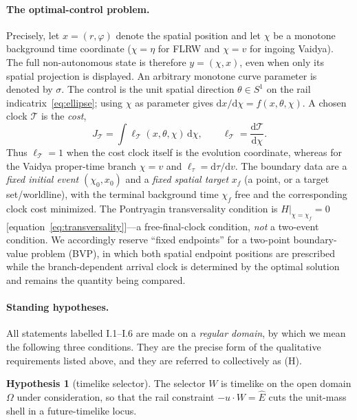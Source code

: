 \documentclass[12pt]{iopart}
\newcommand{\Ehat}{\hat E}
\newcommand{\dd}{\mathrm{d}}
\theoremstyle{plain}
\theoremstyle{definition}
\newtheorem{hypothesis}{Hypothesis}
\theoremstyle{plain}
\theoremstyle{remark}
\begin{document}
\paragraph{The optimal-control problem.} Precisely, let $x=(r,\varphi)$ denote the
spatial position and let $\chi$ be a monotone background time coordinate ($\chi=\eta$
for FLRW and $\chi=v$ for ingoing Vaidya). The full non-autonomous state is therefore
$y=(\chi,x)$, even when only its spatial projection is displayed. An arbitrary monotone
curve parameter is denoted by $\sigma$. The control is the unit spatial direction
$\theta\in S^1$ on the rail indicatrix~\eqref{eq:ellipse}; using $\chi$ as parameter gives
$\dd x/\dd\chi=f(x,\theta,\chi)$. A chosen clock $\mathcal T$ is the \emph{cost},
\[
    J_{\mathcal T}=\int \ell_{\mathcal T}(x,\theta,\chi)\,\dd\chi,
    \qquad \ell_{\mathcal T}=\frac{\dd\mathcal T}{\dd\chi}.
\]
Thus $\ell_{\mathcal T}=1$ when the cost clock itself is the evolution coordinate,
whereas for the Vaidya proper-time branch $\chi=v$ and
$\ell_\tau=\dd\tau/\dd v$. The boundary data are a \emph{fixed initial event}
$(\chi_0,x_0)$ and a \emph{fixed spatial target} $x_f$ (a point, or a target
set/worldline), with the terminal background time $\chi_f$ free and the corresponding
clock cost minimized. The Pontryagin transversality condition is
$H|_{\chi=\chi_f}=0$ [equation~\eqref{eq:transversality}]---a free-final-clock condition,
\emph{not} a two-event condition. We accordingly reserve ``fixed endpoints'' for a
two-point boundary-value problem (BVP), in which both spatial endpoint positions are
prescribed while the branch-dependent arrival clock is determined by the optimal
solution and remains the quantity being compared.

\paragraph{Standing hypotheses.} All statements labelled I.1--I.6 are made on a
\emph{regular domain}, by which we mean the following three conditions. They are the
precise form of the qualitative requirements listed above, and they are referred to
collectively as (H).

\begin{hypothesis}[timelike selector]\label{hyp:selector}
The selector $W$ is timelike on the open domain $\Omega$ under consideration, so that the
rail constraint $-u\cdot W=\Ehat$ cuts the unit-mass shell in a future-timelike locus.
\end{hypothesis}
\end{document}
